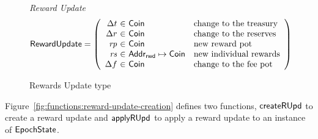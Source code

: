 \begin{figure}[htb]
  \emph{Reward Update}
  \begin{equation*}
    \RewardUpdate =
    \left(
      \begin{array}{r@{~\in~}ll}
        \Delta t & \Coin & \text{change to the treasury} \\
        \Delta r & \Coin & \text{change to the reserves} \\
        \var{rp} & \Coin & \text{new reward pot} \\
        \var{rs} & \AddrRWD\mapsto\Coin & \text{new individual rewards} \\
        \Delta f & \Coin & \text{change to the fee pot} \\
      \end{array}
    \right)
  \end{equation*}
  \caption{Rewards Update type}
  \label{fig:defs:reward-update}
\end{figure}

\clearpage

Figure~\ref{fig:functions:reward-update-creation} defines two functions,
$\mathsf{createRUpd}$ to create a reward update and $\mathsf{applyRUpd}$ to apply a reward update
to an instance of $\mathsf{EpochState}$.

